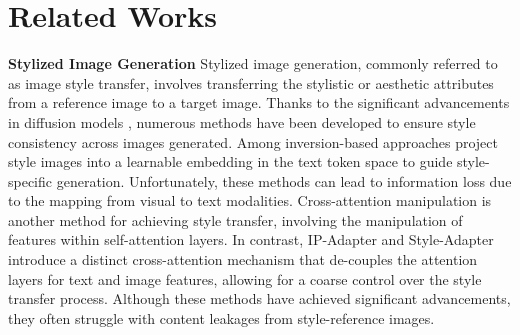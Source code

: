 \section{Related Works}
\textbf{Stylized Image Generation}
Stylized image generation, commonly referred to as image style transfer, involves transferring the stylistic or aesthetic attributes from a reference image to a target image. 
Thanks to the significant advancements in diffusion models \citep{DDPM, SDXL, DDIM, li2024blip, rombach2022high, Classifier-Free, ramesh2022hierarchical, saharia2022photorealistic, nichol2021glide},
numerous methods \citep{sun2023sgdiff, xu2024freetuner, lu2023specialist, lin2024ctrl} have been developed to ensure style consistency across images generated. Among inversion-based approaches \citep{InST, gal2022imageworthwordpersonalizing, StyleAligned} project style images into a learnable embedding in the text token space to guide style-specific generation. Unfortunately, these methods can lead to information loss due to the mapping from visual to text modalities.
Cross-attention manipulation \citep{le2022styleid, StyleAligned, chung2024style, StyleAligned, StyleAdapter} is another method for achieving style transfer, involving the manipulation of features within self-attention layers. 
In contrast, IP-Adapter \citep{ye2023ip} and Style-Adapter \citep{StyleAdapter} introduce a distinct cross-attention mechanism that de-couples the attention layers for text and image features, allowing for a coarse control over the style transfer process. 
Although these methods have achieved significant advancements, they often struggle with content leakages from style-reference images.


